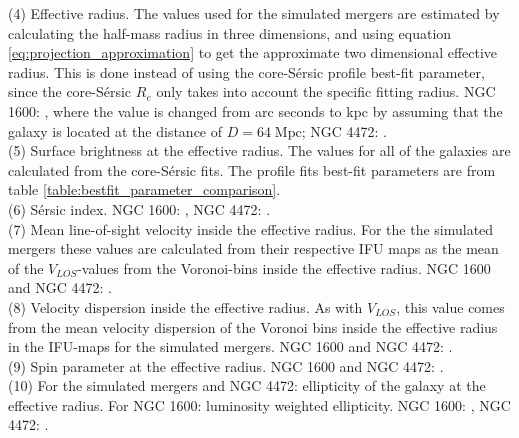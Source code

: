 \documentclass[english, oneside]{HYgradu}
\begin{document}
\begin{table}
{	(4) Effective radius. The values used for the simulated mergers are estimated by calculating the half-mass radius in three dimensions, and using equation \ref{eq:projection_approximation} to get the approximate two dimensional effective radius. This is done instead of using the core-Sérsic profile best-fit parameter, since the core-Sérsic $R_e$ only takes into account the specific fitting radius. NGC 1600: \cite{Thomas2016}, where the value is changed from arc seconds to kpc by assuming that the galaxy is located at the distance of $D = 64 \; \mathrm{Mpc}$; NGC 4472: \cite{Veale2017veldisp}. \\
	(5) Surface brightness at the effective radius. The values for all of the galaxies are calculated from the core-Sérsic fits. The profile fits best-fit parameters are from table \ref{table:bestfit_parameter_comparison}. \\
	(6) Sérsic index. NGC 1600: \cite{Thomas2016}, NGC 4472: \cite{Rusli2013}. \\
	(7) Mean line-of-sight velocity inside the effective radius. For the the simulated mergers these values are calculated from their respective IFU maps as the mean of the $V_{LOS}$-values from the Voronoi-bins inside the effective radius. NGC 1600 and NGC 4472: \cite{Bender1994}. \\
	(8) Velocity dispersion inside the effective radius. As with $V_{LOS}$, this value comes from the mean velocity dispersion of the Voronoi bins inside the effective radius in the IFU-maps for the simulated mergers. NGC 1600 and NGC 4472: \cite{Veale2017veldisp}.\\
	(9) Spin parameter at the effective radius. NGC 1600 and NGC 4472: \citep{Veale2018lambda}. \\
	(10) For the simulated mergers and NGC 4472: ellipticity of the galaxy at the effective radius. For NGC 1600: luminosity weighted ellipticity. NGC 1600: \cite{Goullaud2018}, NGC 4472: \cite{Emsellem2011}.
	}
	\label{table:snap6_vs_NGC1600}
\end{table}
\end{document}
